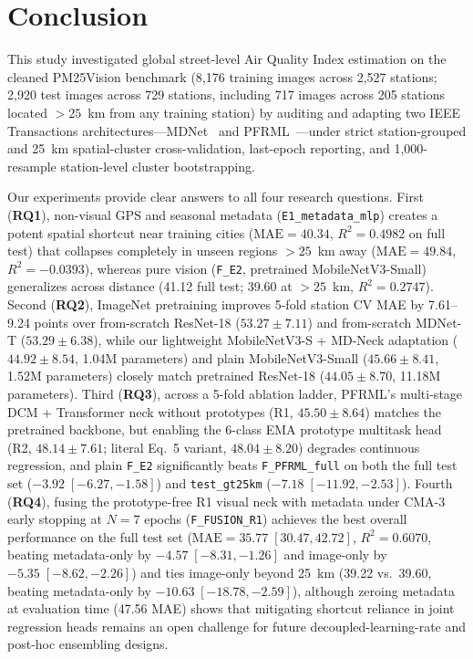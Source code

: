 \documentclass[conference]{IEEEtran}
\begin{document}
\section{Conclusion}
\label{sec:conclusion}

This study investigated global street-level Air Quality Index estimation on the
cleaned PM25Vision benchmark (8,176 training images across 2,527 stations; 2,920
test images across 729 stations, including 717 images across 205 stations
located $> 25$~km from any training station) by auditing and adapting two IEEE
Transactions architectures---MDNet~\cite{wangLightweightAirQuality2024} and
PFRML~\cite{wangPrototypeFeatureRepresentationGuided2026}---under strict
station-grouped and 25~km spatial-cluster cross-validation, last-epoch
reporting, and 1,000-resample station-level cluster bootstrapping.

Our experiments provide clear answers to all four research questions. First
(\textbf{RQ1}), non-visual GPS and seasonal metadata
(\texttt{E1\_metadata\_mlp}) creates a potent spatial shortcut near training
cities ($\text{MAE} = 40.34$, $R^2 = 0.4982$ on full test) that collapses
completely in unseen regions $> 25$~km away ($\text{MAE} = 49.84$,
$R^2 = -0.0393$), whereas pure vision (\texttt{F\_E2}, pretrained
MobileNetV3-Small) generalizes across distance (41.12 full test; 39.60 at
$> 25$~km, $R^2 = 0.2747$). Second (\textbf{RQ2}), ImageNet pretraining improves
5-fold station CV MAE by 7.61--9.24 points over from-scratch ResNet-18
($53.27 \pm 7.11$) and from-scratch MDNet-T ($53.29 \pm 6.38$), while our
lightweight MobileNetV3-S + MD-Neck adaptation ($44.92 \pm 8.54$, 1.04M
parameters) and plain MobileNetV3-Small ($45.66 \pm 8.41$, 1.52M parameters)
closely match pretrained ResNet-18 ($44.05 \pm 8.70$, 11.18M parameters). Third
(\textbf{RQ3}), across a 5-fold ablation ladder, PFRML's multi-stage DCM +
Transformer neck without prototypes (R1, $45.50 \pm 8.64$) matches the
pretrained backbone, but enabling the 6-class EMA prototype multitask head (R2,
$48.14 \pm 7.61$; literal Eq.~5 variant, $48.04 \pm 8.20$) degrades continuous
regression, and plain \texttt{F\_E2} significantly beats \texttt{F\_PFRML\_full}
on both the full test set ($-3.92\;[-6.27, -1.58]$) and \texttt{test\_gt25km}
($-7.18\;[-11.92, -2.53]$). Fourth (\textbf{RQ4}), fusing the prototype-free R1
visual neck with metadata under CMA-3 early stopping at $N = 7$ epochs
(\texttt{F\_FUSION\_R1}) achieves the best overall performance on the full test
set ($\text{MAE} = 35.77\;[30.47, 42.72]$, $R^2 = 0.6070$, beating metadata-only
by $-4.57\;[-8.31, -1.26]$ and image-only by $-5.35\;[-8.62, -2.26]$) and ties
image-only beyond 25~km (39.22 vs.\ 39.60, beating metadata-only by
$-10.63\;[-18.78, -2.59]$), although zeroing metadata at evaluation time (47.56
MAE) shows that mitigating shortcut reliance in joint regression heads remains
an open challenge for future decoupled-learning-rate and post-hoc ensembling
designs.
\end{document}
